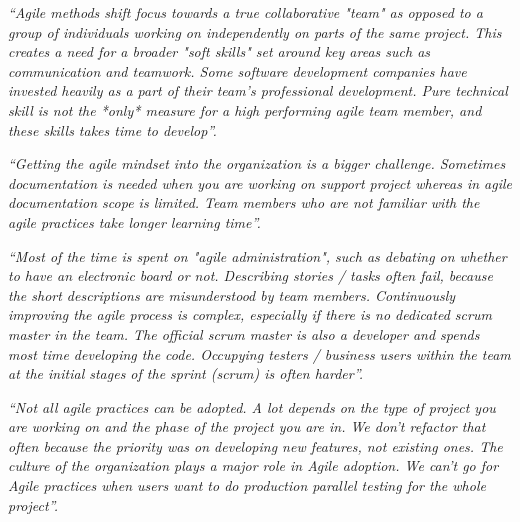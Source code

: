 \documentclass[a4paper,oneside]{bth}
\begin{document}
\textit{“Agile methods shift focus towards a true collaborative "team" as opposed to a group of individuals working on independently on parts of the same project. This creates a need for a broader "soft skills" set around key areas such as communication and teamwork. Some software development companies have invested heavily as a part of their team's professional development. Pure technical skill is not the *only* measure for a high performing agile team member, and these skills takes time to develop”.}

\textit{“Getting the agile mindset into the organization is a bigger challenge. Sometimes documentation is needed when you are working on support project whereas in agile documentation scope is limited. Team members who are not familiar with the agile practices take longer learning time”.}

\textit{“Most of the time is spent on "agile administration", such as debating on whether to have an electronic board or not. Describing stories / tasks often fail, because the short descriptions are misunderstood by team members. Continuously improving the agile process is complex, especially if there is no dedicated scrum master in the team. The official scrum master is also a developer and spends most time developing the code. Occupying testers / business users within the team at the initial stages of the sprint (scrum) is often harder”.}

\textit{“Not all agile practices can be adopted. A lot depends on the type of project you are working on and the phase of the project you are in. We don't refactor that often because the priority was on developing new features, not existing ones. The culture of the organization plays a major role in Agile adoption. We can't go for Agile practices when users want to do production parallel testing for the whole project”.}
\end{document}
